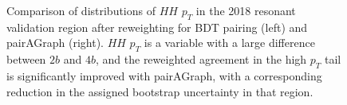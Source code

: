 \begin{figure}[ht]
	\centering
	\caption{\label{fig:pt-hh-compare} Comparison of distributions of $HH$ $p_{T}$ in the 2018 resonant validation region after reweighting for BDT pairing (left) and pairAGraph (right). $HH$ $p_{T}$ is a variable with a 
	large difference between $2b$ and $4b$, and the reweighted agreement in the high $p_{T}$ tail is significantly 
	improved with pairAGraph, with a corresponding reduction in the assigned bootstrap uncertainty in that region.}
\end{figure} 


